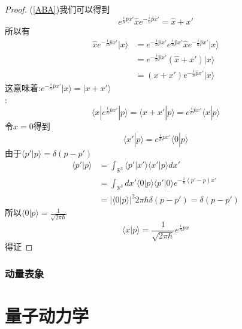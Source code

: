 \documentclass[a4paper,11pt]{book}
\newtheorem{proof}{证明}[section]
\newcommand{\x}{\hat{x}}
\newcommand{\p}{\hat{p}}
\begin{document}
\begin{proof}
(\eqref{ABA})我们可以得到
\begin{equation*}
  e^{\frac{i}{\hbar}\p x'}\x e^{-\frac{i}{\hbar}\p x'}=\x+x'
\end{equation*}
所以有
\begin{equation*}
  \begin{split}
     \x e^{-\frac{i}{\hbar}\p x'}|x\rangle&=e^{-\frac{i}{\hbar}\p x'}e^{\frac{i}{\hbar}\p x'}\x e^{-\frac{i}{\hbar}\p x'}|x\rangle\\
       &=e^{-\frac{i}{\hbar}\p x'}(\x+x')|x\rangle\\
       &=(x+x')e^{-\frac{i}{\hbar}\p x'}|x\rangle
  \end{split}
\end{equation*}
这意味着:$e^{-\frac{i}{\hbar}\p x'}|x\rangle=|x+x'\rangle$\\
:
\begin{equation*}
  \langle x|e^{\frac{i}{\hbar}\p x'}|p\rangle=\langle x+x'|p\rangle=e^{\frac{i}{\hbar}\p x'}\langle x|p\rangle
\end{equation*}
令$x=0$得到
\begin{equation*}
  \langle x'|p\rangle=e^{\frac{i}{\hbar}px'}\langle0|p\rangle
\end{equation*}
由于$\langle p'|p\rangle=\delta(p-p')$
\begin{equation*}
  \begin{split}
     \langle p'|p\rangle&=\int_{\mathbb{R}^3}\langle p'|x'\rangle\langle x'|p\rangle dx'\\
       &=\int_{\mathbb{R}^3}dx'\langle0|p\rangle\langle p'|0\rangle e^{-\frac{i}{\hbar}(p'-p)x'}\\
       &=|\langle 0|p\rangle|^2 2\pi\hbar\delta(p-p')=\delta(p-p')
  \end{split}
\end{equation*}
所以$\langle 0|p\rangle=\frac{1}{\sqrt{2\pi\hbar}}$\\
\begin{equation*}
  \langle x|p\rangle=\frac{1}{\sqrt{2\pi\hbar}}e^{\frac{i}{\hbar}px}
\end{equation*}
得证
\end{proof}

\subsection{动量表象}
\chapter{量子动力学}
\end{document}
